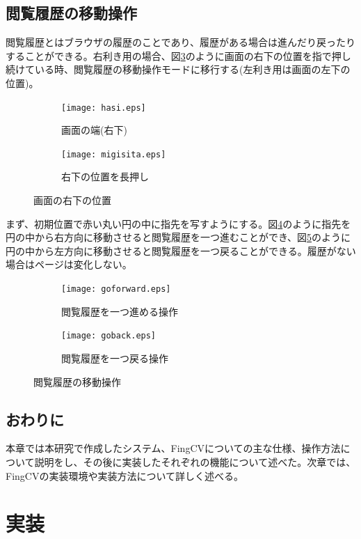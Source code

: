 \documentclass[11pt,a4j, titlepage]{jarticle} %
\begin{document}
\subsection{閲覧履歴の移動操作}
閲覧履歴とはブラウザの履歴のことであり、履歴がある場合は進んだり戻ったりすることができる。右利き用の場合、図\ref{fig:f11}のように画面の右下の位置を指で押し続けている時、閲覧履歴の移動操作モードに移行する(左利き用は画面の左下の位置)。

\begin{figure}[H]
	\centering
	\begin{subfigure}{0.4\columnwidth}
		\centering
		\texttt{[image: hasi.eps]}
		\caption{画面の端(右下)}
		\label{fig:hasi3}
	\end{subfigure}
	\begin{subfigure}{0.4\columnwidth}
		\centering
		\texttt{[image: migisita.eps]}
		\caption{右下の位置を長押し}
		\label{fig:chuousita}
	\end{subfigure}
	\caption{画面の右下の位置}
	\label{fig:f11}
\end{figure}

まず、初期位置で赤い丸い円の中に指先を写すようにする。図\ref{fig:goforward}のように指先を円の中から右方向に移動させると閲覧履歴を一つ進むことができ、図\ref{fig:goback}のように円の中から左方向に移動させると閲覧履歴を一つ戻ることができる。履歴がない場合はページは変化しない。

\begin{figure}[H]
	\centering
	\begin{subfigure}{0.4\columnwidth}
		\centering
		\texttt{[image: goforward.eps]}
		\caption{閲覧履歴を一つ進める操作}
		\label{fig:goforward}
	\end{subfigure}
	\begin{subfigure}{0.4\columnwidth}
		\centering
		\texttt{[image: goback.eps]}
		\caption{閲覧履歴を一つ戻る操作}
		\label{fig:goback}
	\end{subfigure}
	\caption{閲覧履歴の移動操作}
	\label{fig:f12}
\end{figure}

\subsection{おわりに}
本章では本研究で作成したシステム、FingCVについての主な仕様、操作方法について説明をし、その後に実装したそれぞれの機能について述べた。次章では、FingCVの実装環境や実装方法について詳しく述べる。

\newpage
\section{実装}
\end{document}
